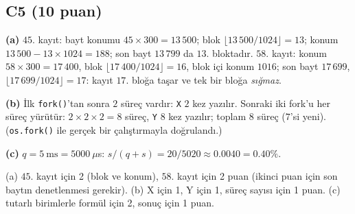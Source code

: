 \documentclass[11pt,a4paper]{article}
\newcommand{\cmd}[1]{\texttt{#1}}
\begin{document}
\subsection*{C5 (10 puan)}
\textbf{(a)} $45$. kayıt: bayt konumu $45 \times 300 = 13\,500$; blok $\lfloor 13\,500/1024 \rfloor = 13$; konum $13\,500 - 13 \times 1024 = 188$; son bayt $13\,799$ da $13$. bloktadır. $58$. kayıt: konum $58 \times 300 = 17\,400$, blok $\lfloor 17\,400/1024\rfloor = 16$, blok içi konum $1016$; son bayt $17\,699$, $\lfloor 17\,699/1024 \rfloor = 17$: kayıt $17$. bloğa taşar ve tek bir bloğa \emph{sığmaz}.

\textbf{(b)} İlk \cmd{fork()}'tan sonra $2$ süreç vardır: \texttt{X} $2$ kez yazılır. Sonraki iki fork'u her süreç yürütür: $2 \times 2 \times 2 = 8$ süreç, \texttt{Y} $8$ kez yazılır; toplam $8$ süreç ($7$'si yeni). (\cmd{os.fork()} ile gerçek bir çalıştırmayla doğrulandı.)

\textbf{(c)} $q = 5\ \text{ms} = 5000\ \mu$s: $s/(q+s) = 20/5020 \approx 0.0040 = 0.40\%$.
\begin{rubric}(a) $45$. kayıt için 2 (blok ve konum), $58$. kayıt için 2 puan (ikinci puan için son baytın denetlenmesi gerekir). (b) X için 1, Y için 1, süreç sayısı için 1 puan. (c) tutarlı birimlerle formül için 2, sonuç için 1 puan.\end{rubric}
\end{document}
